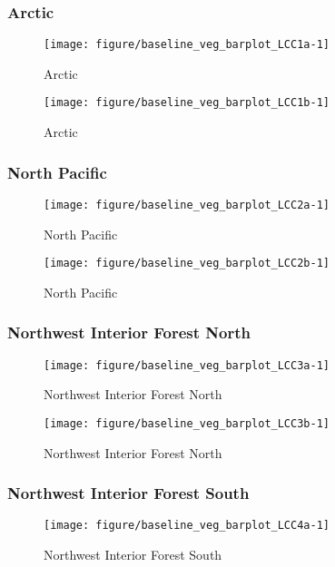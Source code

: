 \documentclass{article}\usepackage[]{graphicx}\usepackage[]{color}
\makeatletter
\def\maxwidth{ %
  \ifdim\Gin@nat@width>\linewidth
    \linewidth
  \else
    \Gin@nat@width
  \fi
}
\makeatother
\begin{document}
\subsubsection{Arctic}
\begin{figure}[H]
\texttt{[image: figure/baseline\_veg\_barplot\_LCC1a-1]} \caption[Arctic]{Arctic\label{fig:baseline_veg_barplot_LCC1a}}
\end{figure}


\begin{figure}[H]
\texttt{[image: figure/baseline\_veg\_barplot\_LCC1b-1]} \caption[Arctic]{Arctic\label{fig:baseline_veg_barplot_LCC1b}}
\end{figure}



\subsubsection{North Pacific}
\begin{figure}[H]
\texttt{[image: figure/baseline\_veg\_barplot\_LCC2a-1]} \caption[North Pacific]{North Pacific\label{fig:baseline_veg_barplot_LCC2a}}
\end{figure}


\begin{figure}[H]
\texttt{[image: figure/baseline\_veg\_barplot\_LCC2b-1]} \caption[North Pacific]{North Pacific\label{fig:baseline_veg_barplot_LCC2b}}
\end{figure}



\subsubsection{Northwest Interior Forest North}
\begin{figure}[H]
\texttt{[image: figure/baseline\_veg\_barplot\_LCC3a-1]} \caption[Northwest Interior Forest North]{Northwest Interior Forest North\label{fig:baseline_veg_barplot_LCC3a}}
\end{figure}


\begin{figure}[H]
\texttt{[image: figure/baseline\_veg\_barplot\_LCC3b-1]} \caption[Northwest Interior Forest North]{Northwest Interior Forest North\label{fig:baseline_veg_barplot_LCC3b}}
\end{figure}



\subsubsection{Northwest Interior Forest South}
\begin{figure}[H]
\texttt{[image: figure/baseline\_veg\_barplot\_LCC4a-1]} \caption[Northwest Interior Forest South]{Northwest Interior Forest South\label{fig:baseline_veg_barplot_LCC4a}}
\end{figure}
\end{document}
